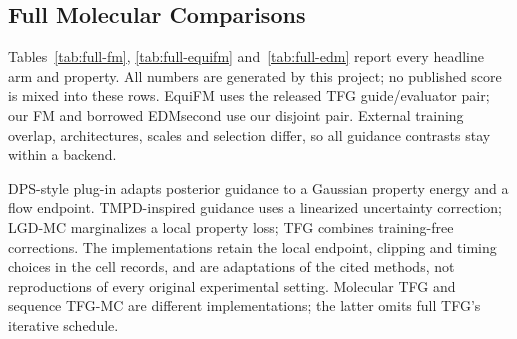 \documentclass{article}
\begin{document}
\subsection{Full Molecular Comparisons}\label{app:comparisons}
Tables~\ref{tab:full-fm}, \ref{tab:full-equifm} and~\ref{tab:full-edm} report every headline arm and property. All numbers are generated by this project; no published score is mixed into these rows. EquiFM uses the released TFG guide/evaluator pair; our FM and borrowed EDMsecond use our disjoint pair. External training overlap, architectures, scales and selection differ, so all guidance contrasts stay within a backend.

DPS-style plug-in adapts posterior guidance to a Gaussian property energy and a flow endpoint. TMPD-inspired guidance uses a linearized uncertainty correction; LGD-MC marginalizes a local property loss; TFG combines training-free corrections. The implementations retain the local endpoint, clipping and timing choices in the cell records, and are adaptations of the cited methods, not reproductions of every original experimental setting. Molecular TFG and sequence TFG-MC are different implementations; the latter omits full TFG's iterative schedule.
\end{document}
